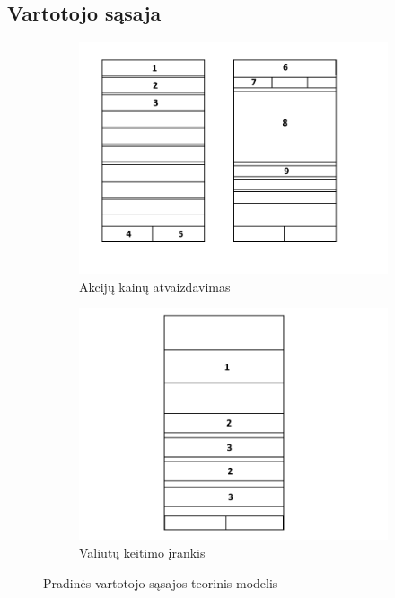 \documentclass[a4paper,12pt,fleqn]{article}
\begin{document}
\subsection{Vartotojo sąsaja}
\begin{figure}[h]
	\centering
	\begin{subfigure}{0.5\textwidth}
		\centering
		\includegraphics[width=1\linewidth]{vartotojo-sasaja.png}
		\caption{Akcijų kainų atvaizdavimas}
		\label{fig:sas1}
	\end{subfigure}%
	\begin{subfigure}{0.5\textwidth}
		\centering
		\includegraphics[width=1\linewidth]{vartotojo-sasaja2.png}
		\caption{Valiutų keitimo įrankis}
		\label{fig:sas2}
	\end{subfigure}
	\caption{Pradinės vartotojo sąsajos teorinis modelis}
	\label{fig:sas}
\end{figure}
\end{document}
